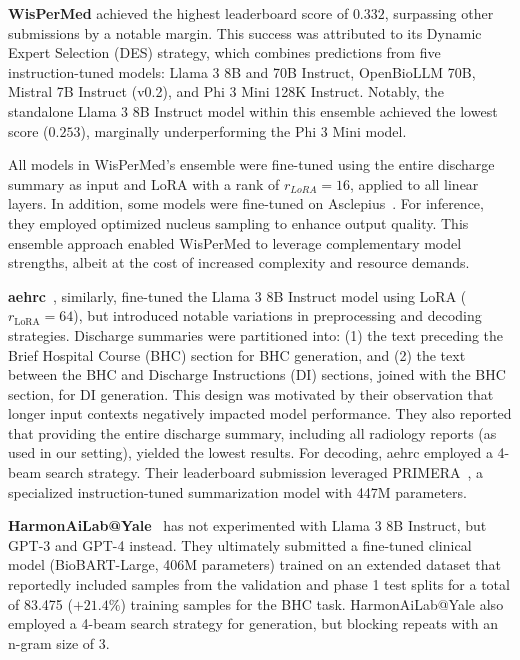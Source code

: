 \textbf{WisPerMed} \citep{damm-etal-2024-wispermed} achieved the highest leaderboard score of $0.332$, surpassing other submissions by a notable margin. This success was attributed to its Dynamic Expert Selection (DES) strategy, which combines predictions from five instruction-tuned models: Llama 3 8B and 70B Instruct, OpenBioLLM 70B, Mistral 7B Instruct (v0.2), and Phi 3 Mini 128K Instruct.  Notably, the standalone Llama 3 8B Instruct model within this ensemble achieved the lowest score ($0.253$), marginally underperforming the Phi 3 Mini model.

All models in WisPerMed's ensemble were fine-tuned using the entire discharge summary as input and LoRA with a rank of $r_{LoRA} = 16$, applied to all linear layers. In addition, some models were fine-tuned on Asclepius~\citep{kweon-etal-2024-publicly}.  For inference, they employed optimized nucleus sampling to enhance output quality. This ensemble approach enabled WisPerMed to leverage complementary model strengths, albeit at the cost of increased complexity and resource demands.

\textbf{aehrc}~\citep{liu-etal-2024-e}, similarly, fine-tuned the Llama 3 8B Instruct model using LoRA ($r_{\text{LoRA}} = 64$), but introduced notable variations in preprocessing and decoding strategies. Discharge summaries were partitioned into: (1) the text preceding the Brief Hospital Course (BHC) section for BHC generation, and (2) the text between the BHC and Discharge Instructions (DI) sections, joined with the BHC section, for DI generation. This design was motivated by their observation that longer input contexts negatively impacted model performance. They also reported that providing the entire discharge summary, including all radiology reports (as used in our setting), yielded the lowest results. For decoding, aehrc employed a 4-beam search strategy. Their leaderboard submission leveraged PRIMERA~\citep{xiao-etal-2022-primera}, a specialized instruction-tuned summarization model with 447M parameters.

\textbf{HarmonAiLab@Yale}~\citep{socrates-etal-2024-yale} has not experimented with Llama 3 8B Instruct, but GPT-3 and GPT-4 instead. 
They ultimately submitted a fine-tuned clinical model (BioBART-Large, 406M parameters) trained on an extended dataset that reportedly included samples from the validation and phase 1 test splits for a total of 83.475 ($+21.4\%$) training samples for the BHC task. HarmonAiLab@Yale also employed a 4-beam search strategy for generation, but blocking repeats with an n-gram size of 3.

